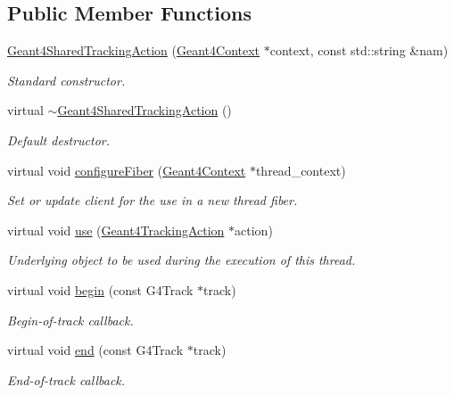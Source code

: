 \subsection*{Public Member Functions}
\begin{DoxyCompactItemize}
\item 
\hyperlink{class_d_d4hep_1_1_simulation_1_1_geant4_shared_tracking_action_a1b88cc76ae24b37f456539fc9ee2e7ab}{Geant4SharedTrackingAction} (\hyperlink{class_d_d4hep_1_1_simulation_1_1_geant4_context}{Geant4Context} $\ast$context, const std::string \&nam)
\begin{DoxyCompactList}\small\item\em Standard constructor. \item\end{DoxyCompactList}\item 
virtual \hyperlink{class_d_d4hep_1_1_simulation_1_1_geant4_shared_tracking_action_a067e930e8c51e9363ec6cb2bf7163c68}{$\sim$Geant4SharedTrackingAction} ()
\begin{DoxyCompactList}\small\item\em Default destructor. \item\end{DoxyCompactList}\item 
virtual void \hyperlink{class_d_d4hep_1_1_simulation_1_1_geant4_shared_tracking_action_a7033aa446a1fbce97cf260caaf55b5b2}{configureFiber} (\hyperlink{class_d_d4hep_1_1_simulation_1_1_geant4_context}{Geant4Context} $\ast$thread\_\-context)
\begin{DoxyCompactList}\small\item\em Set or update client for the use in a new thread fiber. \item\end{DoxyCompactList}\item 
virtual void \hyperlink{class_d_d4hep_1_1_simulation_1_1_geant4_shared_tracking_action_a7810fb89525433a623056dcb8afb5b48}{use} (\hyperlink{class_d_d4hep_1_1_simulation_1_1_geant4_tracking_action}{Geant4TrackingAction} $\ast$action)
\begin{DoxyCompactList}\small\item\em Underlying object to be used during the execution of this thread. \item\end{DoxyCompactList}\item 
virtual void \hyperlink{class_d_d4hep_1_1_simulation_1_1_geant4_shared_tracking_action_a67db960b642ca48cc171c0d1296e4125}{begin} (const G4Track $\ast$track)
\begin{DoxyCompactList}\small\item\em Begin-\/of-\/track callback. \item\end{DoxyCompactList}\item 
virtual void \hyperlink{class_d_d4hep_1_1_simulation_1_1_geant4_shared_tracking_action_a35f435a97bbe15def248f21f37847a12}{end} (const G4Track $\ast$track)
\begin{DoxyCompactList}\small\item\em End-\/of-\/track callback. \item\end{DoxyCompactList}\end{DoxyCompactItemize}
